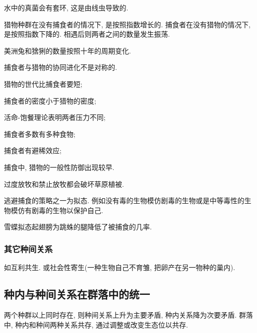 \documentclass{ctexart}
\begin{document}
水中的真菌会有套环, 这是由线虫导致的.
\par
猎物种群在没有捕食者的情况下, 是按照指数增长的. 捕食者在没有猎物的情况下, 是按照指数下降的. 相遇后则两者之间的数量发生振荡.
\begin{ex}
    美洲兔和猞猁的数量按照十年的周期变化.
\end{ex}
捕食者与猎物的协同进化不是对称的.
\begin{cenum}
    \item 猎物的世代比捕食者要短;
    \item 捕食者的密度小于猎物的密度;
    \item 活命-饱餐理论表明两者压力不同;
    \item 捕食者多数有多种食物;
    \item 捕食者有避稀效应;
    \item 捕食中, 猎物的一般性防御出现较早.
\end{cenum}
\begin{ex}
    过度放牧和禁止放牧都会破坏草原植被.
\end{ex}
逃避捕食的策略之一为拟态. 例如没有毒的生物模仿剧毒的生物或是中等毒性的生物模仿有剧毒的生物以保护自己.
\begin{ex}
    雪蝶拟态起翅膀为跳蛛的腿降低了被捕食的几率.
\end{ex}


\subsubsection{其它种间关系} %
\label{ssub:其它种间关系}

如互利共生. 或社会性寄生(一种生物自己不育雏, 把卵产在另一物种的巢内).



\subsection{种内与种间关系在群落中的统一} %
\label{sub:种内与种间关系在群落中的统一}

两个种群以上同时存在, 则种间关系上升为主要矛盾, 种内关系降为次要矛盾. 群落中, 种内和种间两种关系共存, 通过调整或改变生态位以共存.


\end{document}
